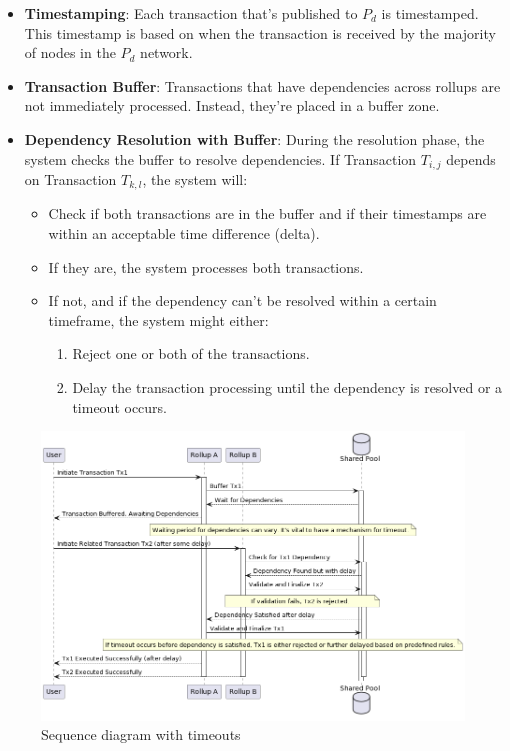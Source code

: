 \documentclass{article}
\begin{document}
\begin{itemize}
    \item \textbf{Timestamping}: Each transaction that's published to \( P_d \) is timestamped. This timestamp is based on when the transaction is received by the majority of nodes in the \( P_d \) network.
    
    \item \textbf{Transaction Buffer}: Transactions that have dependencies across rollups are not immediately processed. Instead, they're placed in a buffer zone.
    
    \item \textbf{Dependency Resolution with Buffer}: During the resolution phase, the system checks the buffer to resolve dependencies. If Transaction \( T_{i,j} \) depends on Transaction \( T_{k,l} \), the system will:
    \begin{itemize}
        \item Check if both transactions are in the buffer and if their timestamps are within an acceptable time difference (delta).
        \item If they are, the system processes both transactions.
        \item If not, and if the dependency can't be resolved within a certain timeframe, the system might either:
        \begin{enumerate}
            \item Reject one or both of the transactions.
            \item Delay the transaction processing until the dependency is resolved or a timeout occurs.
        \end{enumerate}
    \end{itemize}
\end{itemize}



\begin{figure}[h]
  \centering
  \includegraphics[scale=0.5]{diagram1}
  \caption{Sequence diagram with timeouts}
\end{figure}
\end{document}
